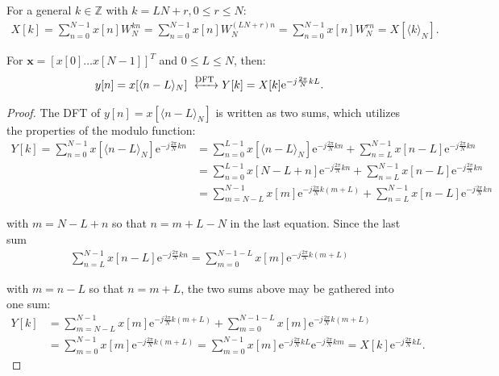 For a general $k\in\mathbb{Z}$ with $k = LN + r, 0 \leq r \leq N$:
\begin{align*}
X[k] = \sum_{n=0}^{N-1} x[n] W_N^{kn} = \sum_{n=0}^{N-1} x[n] W_N^{(LN+r)n} = \sum_{n=0}^{N-1} x[n] W_N^{rn} = X[\langle k\rangle_N].
\end{align*}

\begin{lemma}
For $\textbf{x} = [x[0] \dots x[N-1]]^T$ and $0 \leq L \leq N$, then:
\begin{align*}
y[n]  = x[\langle n-L\rangle_N] \xleftrightarrow{\text{DFT}} Y[k] = X[k] \text{e}^{-j\frac{2\pi}{N} kL}.
\end{align*}
\end{lemma}

\begin{proof}
The DFT of $y[n] = x[\langle n-L\rangle_N]$ is written as two sums, which utilizes the properties of the modulo function:
\begin{align*}
Y[k] = \sum_{n=0}^{N-1} x[\langle n-L\rangle_N] \text{e}^{-j\frac{2\pi}{N} kn} &= \sum_{n=0}^{L-1} x[\langle n-L\rangle_N]\text{e}^{-j\frac{2\pi}{N} kn} + \sum_{n=L}^{N-1} x[n-L]\text{e}^{-j\frac{2\pi}{N} kn} \\
&= \sum_{n=0}^{L-1} x[N-L+n]\text{e}^{-j\frac{2\pi}{N} kn} + \sum_{n=L}^{N-1} x[n-L]\text{e}^{-j\frac{2\pi}{N} kn} \\
&= \sum_{m=N-L}^{N-1} x[m]\text{e}^{-j\frac{2\pi}{N} k(m+L)} + \sum_{n=L}^{N-1} x[n-L]\text{e}^{-j\frac{2\pi}{N} kn}
\end{align*}

with $m = N - L + n$ so that $n = m + L - N$ in the last equation. Since the last sum
\begin{align*}
\sum_{n=L}^{N-1} x[n-L]\text{e}^{-j\frac{2\pi}{N} kn} = \sum_{m=0}^{N-1-L} x[m] \text{e}^{-j\frac{2\pi}{N}k(m+L)}
\end{align*}

with $m = n - L$ so that $n = m + L$, the two sums above may be gathered into one sum:
\begin{align*}
Y[k] &= \sum_{m=N-L}^{N-1} x[m]\text{e}^{-j\frac{2\pi}{N} k(m+L)} + \sum_{m=0}^{N-1-L} x[m] \text{e}^{-j\frac{2\pi}{N}k(m+L)}  \\
&= \sum_{m=0}^{N-1} x[m] \text{e}^{-j\frac{2\pi}{N}k(m+L)} = \sum_{m=0}^{N-1} x[m] \text{e}^{-j\frac{2\pi}{N}kL}\text{e}^{-j\frac{2\pi}{N}km} = X[k] \text{e}^{-j\frac{2\pi}{N}kL}.
\end{align*}
\end{proof}

